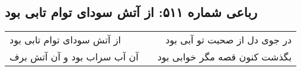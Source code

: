 \begin{center}
\section*{رباعی شماره ۵۱۱: از آتش سودای توام تابی بود}
\label{sec:0511}
\begin{longtable}{l p{0.5cm} r}
از آتش سودای توام تابی بود
&&
در جوی دل از صحبت تو آبی بود
\\
آن آب سراب بود و آن آتش برف
&&
بگذشت کنون قصه مگر خوابی بود
\\
\end{longtable}
\end{center}
